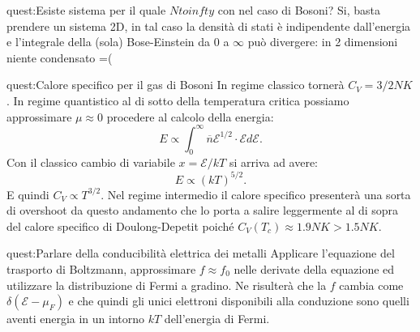 \begin{quest}{quest:Esiste sistema per il quale $Ntoinfty$ con  nel caso di Bosoni?}
    Si, basta prendere un sistema 2D, in tal caso la densità di stati è indipendente dall'energia e l'integrale della (sola) Bose-Einstein da 0 a $\infty$ può divergere: in 2 dimensioni niente condensato =(
\end{quest}
\begin{quest}{quest:Calore specifico per il gas di Bosoni}
    In regime classico tornerà $C_V = 3 /2 NK$. In regime quantistico al di sotto della temperatura critica possiamo approssimare $\mu\approx  0$ procedere al calcolo della energia:
\[
    E \propto  \int_0^{\infty} \overline{n}\mathcal{E}^{1 /2}\cdot \mathcal{E}  d\mathcal{E}
.\] 
Con il classico cambio di variabile $x = \mathcal{E}  /kT$ si arriva ad avere:
\[
    E \propto  \left(kT\right)^{5 /2}
.\] 
E quindi $C_V \propto T^{3 /2}$. Nel regime intermedio il calore specifico presenterà una sorta di overshoot da questo andamento che lo porta a salire leggermente al di sopra del calore specifico di Doulong-Depetit poiché $C_V(T_c) \approx 1.9 NK > 1.5 NK$.
\end{quest}
\begin{quest}{quest:Parlare della conducibilità elettrica dei metalli}
    Applicare l'equazione del trasporto di Boltzmann, approssimare $f\approx f_0$ nelle derivate della equazione ed utilizzare la distribuzione di Fermi a gradino. Ne risulterà che la $f$ cambia come $\delta (\mathcal{E}-\mu_F)$ e che quindi gli unici elettroni disponibili alla conduzione sono quelli aventi energia in un intorno $kT$ dell'energia di Fermi.
\end{quest}

